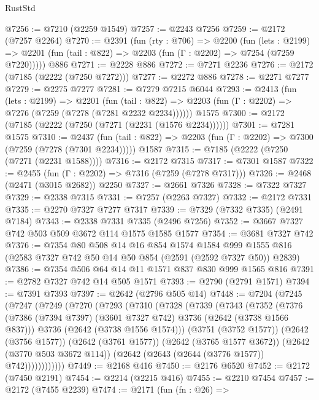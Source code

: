 \begin{lexlean}{RustStd}
\begin{coremodule}
@7256 := @7210 (@2259 @1549)
@7257 := @2243 @7256
@7259 := @2172 (@7257 @2264)
@7270 := @2391
    (fun (rty : @706) =>
    @2200
      (fun (lets : @2199) =>
      @2201 (fun (tail : @822) => @2203 (fun (Γ : @2202) => @7254 (@7259 @7220)))))
    @886
@7271 := @2228 @886
@7272 := @7271 @2236
@7276 := @2172 (@7185 (@2222 (@7250 @7272)))
@7277 := @2272 @886
@7278 := @2271 @7277
@7279 := @2275 @7277
@7281 := @7279 @7215 @6044
@7293 := @2413
    (fun (lets : @2199) =>
    @2201
      (fun (tail : @822) => @2203 (fun (Γ : @2202) => @7276 (@7259 (@7278 (@7281 @2232 @2234))))))
    @1575
@7300 := @2172 (@7185 (@2222 (@7250 (@7271 (@2231 (@1576 @2234))))))
@7301 := @7281 @1575
@7310 := @2437
    (fun (tail : @822) => @2203 (fun (Γ : @2202) => @7300 (@7259 (@7278 (@7301 @2234)))))
    @1587
@7315 := @7185 (@2222 (@7250 (@7271 (@2231 @1588))))
@7316 := @2172 @7315
@7317 := @7301 @1587
@7322 := @2455 (fun (Γ : @2202) => @7316 (@7259 (@7278 @7317)))
@7326 := @2468 (@2471 (@3015 @2682)) @2250
@7327 := @2661 @7326
@7328 := @7322 @7327
@7329 := @2338 @7315
@7331 := @7257 (@2263 @7327)
@7332 := @2172 @7331
@7335 := @2270 @7327 @7277 @7317
@7339 := @7329 (@7332 @7335) (@2491 @7184)
@7343 := @2338 @7331 @7335 (@2496 @7256)
@7352 := @3667 @7327 @742 @503 @509 @3672 @114 @1575 @1585 @1577
@7354 := @3681 @7327 @742
@7376 := @7354
    @80
    @508
    @14
    @16
    @854
    @1574
    @1584
    @999
    @1555
    @816
    (@2583 @7327 @742 @50 @14 @50 @854 (@2591 (@2592 @7327 @50)) @2839)
@7386 := @7354 @506 @64 @14 @11 @1571 @837 @830 @999 @1565 @816
@7391 := @2782 @7327 @742 @14 @505 @1571
@7393 := @2790 (@2791 @1571)
@7394 := @7391 @7393
@7397 := @2642 (@2796 @505 @14)
@7448 := @7204
    (@7245
      (@7247
        (@7249
          (@7270
            (@7293
              (@7310
                (@7328
                  (@7339
                    (@7343
                      (@7352
                        (@7376
                          (@7386 (@7394 @7397) (@3601 @7327 @742) @3736 (@2642 (@3738 @1566 @837)))
                          @3736
                          (@2642 (@3738 @1556 @1574)))
                        (@3751 (@3752 @1577))
                        (@2642 (@3756 @1577))
                        (@2642 (@3761 @1577))
                        (@2642 (@3765 @1577 @3672))
                        (@2642 (@3770 @503 @3672 @114))
                        (@2642 (@2643 (@2644 (@3776 @1577)) @742))))))))))))
@7449 := @2168 @416
@7450 := @2176 @6520
@7452 := @2172 (@7450 @2191)
@7454 := @2214 (@2215 @416)
@7455 := @2210 @7454
@7457 := @2172 (@7455 @2239)
@7474 := @2171
    (fun (fn : @26) =>

\end{coremodule}
\end{lexlean}
